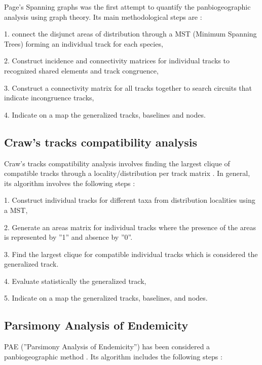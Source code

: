 Page's Spanning graphs was the first attempt to quantify the panbiogeographic
analysis using graph theory. Its main methodological steps are \citep{Page1987}:

1. connect the disjunct areas of distribution through a MST (Minimum Spanning
Trees) forming an individual track for each species,

2. Construct incidence and connectivity
matrices for individual tracks to recognized shared elements and track
congruence,

3. Construct a connectivity matrix for all tracks together to search
circuits that indicate incongruence tracks,

4. Indicate on a map the generalized
tracks, baselines and nodes.

\subsection{Craw's tracks compatibility analysis}

Craw's tracks compatibility analysis \citep{Craw1989a} involves finding the
largest clique of compatible tracks through a locality/distribution per track
matrix \citep{Crawetal1999}. In general, its algorithm involves the following
steps \citep{Craw1989a, Grehan2001c, Morrone2004c}:

1. Construct individual tracks for different taxa from distribution localities using a MST,

2. Generate an areas matrix for individual tracks where the presence of the areas is
represented by ''1'' and absence by ''0''.

3. Find the largest clique for compatible individual tracks which is considered the generalized track.

4. Evaluate statistically the generalized track,

5. Indicate on a map the
generalized tracks, baselines, and nodes.


\subsection{Parsimony Analysis of Endemicity}


PAE (''Parsimony Analysis of Endemicity'') has been considered a
panbiogeographic method \citep{Crawetal1999, Luna-vegaetal2000,
MorroneMarquez2001, Morrone2004c}. Its algorithm includes the following steps
\citep {Morrone2004c}:

